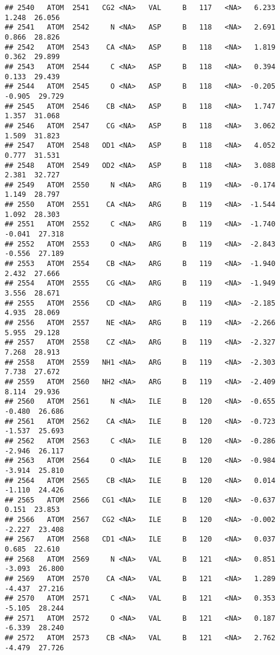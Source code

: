 \documentclass[
]{article}
\begin{document}
\begin{verbatim}
## 2540   ATOM  2541   CG2 <NA>   VAL     B   117   <NA>   6.233   1.248  26.056
## 2541   ATOM  2542     N <NA>   ASP     B   118   <NA>   2.691   0.866  28.826
## 2542   ATOM  2543    CA <NA>   ASP     B   118   <NA>   1.819   0.362  29.899
## 2543   ATOM  2544     C <NA>   ASP     B   118   <NA>   0.394   0.133  29.439
## 2544   ATOM  2545     O <NA>   ASP     B   118   <NA>  -0.205  -0.905  29.729
## 2545   ATOM  2546    CB <NA>   ASP     B   118   <NA>   1.747   1.357  31.068
## 2546   ATOM  2547    CG <NA>   ASP     B   118   <NA>   3.062   1.509  31.823
## 2547   ATOM  2548   OD1 <NA>   ASP     B   118   <NA>   4.052   0.777  31.531
## 2548   ATOM  2549   OD2 <NA>   ASP     B   118   <NA>   3.088   2.381  32.727
## 2549   ATOM  2550     N <NA>   ARG     B   119   <NA>  -0.174   1.149  28.797
## 2550   ATOM  2551    CA <NA>   ARG     B   119   <NA>  -1.544   1.092  28.303
## 2551   ATOM  2552     C <NA>   ARG     B   119   <NA>  -1.740  -0.041  27.318
## 2552   ATOM  2553     O <NA>   ARG     B   119   <NA>  -2.843  -0.556  27.189
## 2553   ATOM  2554    CB <NA>   ARG     B   119   <NA>  -1.940   2.432  27.666
## 2554   ATOM  2555    CG <NA>   ARG     B   119   <NA>  -1.949   3.556  28.671
## 2555   ATOM  2556    CD <NA>   ARG     B   119   <NA>  -2.185   4.935  28.069
## 2556   ATOM  2557    NE <NA>   ARG     B   119   <NA>  -2.266   5.955  29.128
## 2557   ATOM  2558    CZ <NA>   ARG     B   119   <NA>  -2.327   7.268  28.913
## 2558   ATOM  2559   NH1 <NA>   ARG     B   119   <NA>  -2.303   7.738  27.672
## 2559   ATOM  2560   NH2 <NA>   ARG     B   119   <NA>  -2.409   8.114  29.936
## 2560   ATOM  2561     N <NA>   ILE     B   120   <NA>  -0.655  -0.480  26.686
## 2561   ATOM  2562    CA <NA>   ILE     B   120   <NA>  -0.723  -1.537  25.693
## 2562   ATOM  2563     C <NA>   ILE     B   120   <NA>  -0.286  -2.946  26.117
## 2563   ATOM  2564     O <NA>   ILE     B   120   <NA>  -0.984  -3.914  25.810
## 2564   ATOM  2565    CB <NA>   ILE     B   120   <NA>   0.014  -1.110  24.426
## 2565   ATOM  2566   CG1 <NA>   ILE     B   120   <NA>  -0.637   0.151  23.853
## 2566   ATOM  2567   CG2 <NA>   ILE     B   120   <NA>  -0.002  -2.227  23.408
## 2567   ATOM  2568   CD1 <NA>   ILE     B   120   <NA>   0.037   0.685  22.610
## 2568   ATOM  2569     N <NA>   VAL     B   121   <NA>   0.851  -3.093  26.800
## 2569   ATOM  2570    CA <NA>   VAL     B   121   <NA>   1.289  -4.437  27.216
## 2570   ATOM  2571     C <NA>   VAL     B   121   <NA>   0.353  -5.105  28.244
## 2571   ATOM  2572     O <NA>   VAL     B   121   <NA>   0.187  -6.339  28.240
## 2572   ATOM  2573    CB <NA>   VAL     B   121   <NA>   2.762  -4.479  27.726

\end{verbatim}
\end{document}
